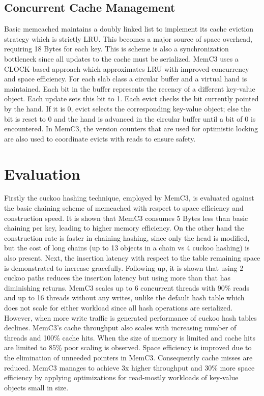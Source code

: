 \documentclass[letterpaper,twocolumn,10pt]{article}
\begin{document}
\subsection{Concurrent Cache Management}
Basic memcached maintains a doubly linked list to implement its cache eviction strategy which is strictly LRU. This becomes a major source of space overhead, requiring 18 Bytes for each key. This is scheme is also a synchronization bottleneck since all updates to the cache must be serialized.
MemC3 uses a CLOCK-based approach which approximates LRU with improved concurrency and space efficiency. For each slab class a circular buffer and a virtual hand is maintained. Each bit in the buffer represents the recency of a different key-value object. Each update sets this bit to 1. Each evict checks the bit currently pointed by the hand. If it is 0, evict selects the corresponding key-value object; else the bit is reset to 0 and the hand is advanced in the circular buffer until a bit of 0 is encountered. 
In MemC3, the version counters that are  used for optimistic locking are also used to  coordinate evicts with reads to ensure safety.

\section{Evaluation}
Firstly the cuckoo hashing technique, employed by MemC3, is evaluated against the basic chaining scheme of memcached with respect to space efficiency and construction speed. It is shown that MemC3 consumes 5 Bytes less than basic chaining per key, leading to higher memory efficiency. On the other hand the construction rate is faster in chaining hashing, since only the head is modified, but the cost of long chains (up to 13 objects in a chain vs 4 cuckoo hashing) is also present.
Next, the insertion latency with respect to the table remaining space is demonstrated to increase gracefully. Following up, it is shown that using 2 cuckoo paths reduces the insertion latency but using more than that has diminishing returns. 
MemC3 scales up to 6 concurrent threads with 90\% reads and up to 16 threads without any writes, unlike the default hash table which does not scale for either workload since all hash operations are serialized. However, when more write traffic is generated performance  of cuckoo hash tables declines.
MemC3's cache throughput also scales with increasing number of threads and 100\% cache hits. When the size of memory is limited and cache hits are limited to 85\% poor scaling is observed. 
Space efficiency is improved due to the elimination of unneeded pointers in MemC3. Consequently cache misses are reduced.
MemC3 manages to achieve 3x higher throughput and 30\% more space efficiency by applying 
optimizations for read-mostly workloads of key-value objects small in size.



{\footnotesize 
}


\theendnotes
\end{document}
